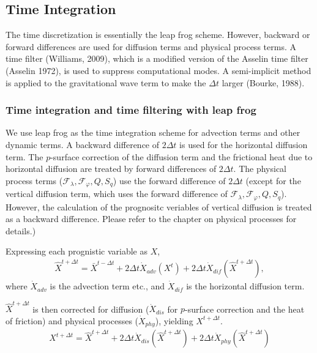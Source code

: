 \hypertarget{time-integration}{%
\subsection{Time Integration}\label{time-integration}}

The time discretization is essentially the leap frog scheme. However,
backward or forward differences are used for diffusion terms and
physical process terms.
A time filter (Williams, 2009), which is a
modified version of the Asselin time filter (Asselin 1972), is used to
suppress computational modes.
A semi-implicit method is applied to
the gravitational wave term to make the \(\Delta t\) larger (Bourke,
1988).

\hypertarget{time-integration-and-time-filtering-with-leap-frog}{%
\subsubsection{Time integration and time filtering with leap
frog}\label{time-integration-and-time-filtering-with-leap-frog}}

We use leap frog as the time integration scheme for advection terms and
other dynamic terms.
A backward difference of \(2 \Delta t\) is used for
the horizontal diffusion term.
The \(p\)-surface correction of the
diffusion term and the frictional heat due to horizontal diffusion
are treated by forward differences of
\(2 \Delta t\). The physical process terms
(\({\mathcal F}_\lambda, {\mathcal F}_\varphi, Q, S_q\)) use the
forward difference of \(2 \Delta t\) (except for the vertical diffusion
term, which uses the forward difference of
\({\mathcal F}_\lambda, {\mathcal F}_\varphi, Q, S_q\)). However, the
calculation of the prognositc veriables of vertical diffusion is treated
as a backward difference. Please refer to the chapter on physical
processes for details.)

Expressing each prognistic variable as \({X}\),
\begin{eqnarray}
  \hat{X}^{t+\Delta t} 
    =  \bar{X}^{t-\Delta t}
    + 2 \Delta t 
      \dot{X}_{adv}\left( {X}^{t} \right)
    + 2 \Delta t 
      \dot{X}_{dif}\left( \hat{X}^{t+\Delta t} \right),
\end{eqnarray}
where \(\dot{X}_{adv}\) is the advection term etc., and
\(\dot{X}_{dif}\) is the horizontal diffusion term.

\(\hat{X}^{t+\Delta t}\) is then corrected for diffusion
(\(\dot{X}_{dis}\) for \(p\)-surface correction and the heat of
friction) and physical processes (\(\dot{X}_{phy}\)), yielding
\({X}^{t+\Delta t}\).
\begin{eqnarray}
  {X}^{t+\Delta t} 
    =  \hat{X}^{t+\Delta t}
    + 2 \Delta t 
      \dot{X}_{dis}\left( \hat{X}^{t+\Delta t} \right)
    + 2 \Delta t 
      \dot{X}_{phy}\left( \hat{X}^{t+\Delta t} \right)
\end{eqnarray}

